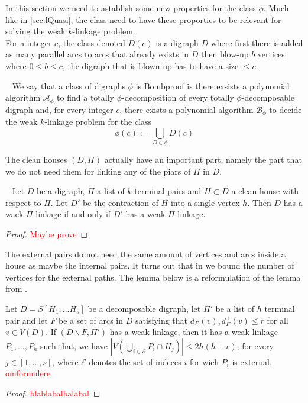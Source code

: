 In this section we need to astablish some new properties for the class $\phi$. Much like in \autoref{sec:lQuasi}, the class need to have these proporties to be relevant for solving the weak $k$-linkage problem.\\ 
For a integer $c$, the class denoted $D(c)$ is a digraph $D$ where first there is added as many parallel arcs to arcs that already exists in $D$ then blow-up $b$ vertices where $0\leq b\leq c$, the digraph that is blown up has to have a size $\leq c$. 

\begin{definition}~\cite{bangJGT85}
    We say that a class of digraphs $\phi$ is Bombproof is there exsists a polynomial algorithm $\mathcal{A}_{\phi}$ to find a totally $\phi$-decomposition of every totally $\phi$-decomposable digraph and, for every integer $c$, there exists a polynomial algorithm  $\mathcal{B}_{\phi}$ to decide the weak $k$-linkage problem for the class
    \begin{equation}
        \phi(c):=\bigcup_{D\in \phi}D(c) 
    \end{equation}
    \label{def:bombproof}
\end{definition}
The clean houses $(D,\Pi)$ actually have an important part, namely the part that we do not need them for linking any of the piars of $\Pi$ in $D$.
\begin{lemma}~\cite{bangJGT85}
    Let $D$ be a digraph, $\Pi$ a list of $k$ terminal pairs and $H\subset D$ a clean house with respect to $\Pi$. Let $D'$ be the contraction of $H$ into a single vertex $h$. Then $D$ has a waek $\Pi$-linkage if and only if $D'$ has a weak $\Pi$-linkage.  
    \label{lemma:cleanhouse}
\end{lemma}
\begin{proof}
    \textcolor{red}{Maybe prove}
\end{proof}
The external pairs do not need the same amount of vertices and arcs inside a house as maybe the internal pairs. It turns out that in \cite{bangJGT77} we bound the number of vertices for the external paths. The lemma below is a reformulation of the lemma from \cite{bangJGT77}. 
\begin{lemma}
    Let $D=S[H_1,\dots H_s]$ be a decomposable digraph, let $\Pi'$ be a list of $h$ terminal pair and let $F$ be a set of arcs in $D$ satisfying that $d^-_F(v),d^+_F(v) \leq r$ for all $v \in V(D)$.
    If $(D\backslash F,\Pi')$ has a weak linkage, then it has a weak linkage $P_1,\dots , P_h$ such that, we have $|V\left( \bigcup_{i\in \mathcal{E}} P_i\cap H_j \right)|\leq 2h(h+r)$, for every $j\in [1,\dots,s]$, where $\mathcal{E}$ denotes the set of indeces $i$ for wich $P_i$ is external.
    \textcolor{red}{omformulere}
    \label{lemma:external}
\end{lemma}
\begin{proof}
    \textcolor{red}{blablabalbalabal}
\end{proof}

